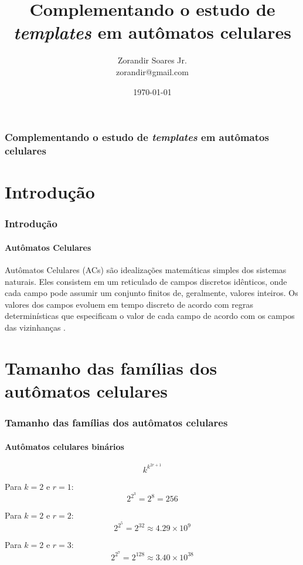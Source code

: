 \documentclass[aspectratio=43]{beamer}
\title{Complementando o estudo de \textit{templates} em autômatos celulares}
\author{Zorandir Soares Jr.\\
zorandir@gmail.com
}
\institute{Universidade Presbiteriana Mackenzie\\
Programa de Pós-Graduação em Engenharia Elétrica\\ \\
}
\date{\today}
\begin{document}
\begin{frame}
	\frametitle{Complementando o estudo de \textit{templates} em autômatos celulares}
    \titlepage
\end{frame}
 
 \section{Introdução}
 \begin{frame}
     \frametitle{Introdução}
     \framesubtitle{Autômatos Celulares}

     Autômatos Celulares (ACs) são idealizações matemáticas simples dos sistemas naturais. Eles consistem em um reticulado de campos discretos idênticos, onde cada campo pode assumir um conjunto finitos de, geralmente, valores inteiros. Os valores dos campos evoluem em tempo discreto de acordo com regras determinísticas que especificam o valor de cada campo de acordo com os campos das vizinhanças \cite{wolfram1994cellular}.
 \end{frame}

\section{Tamanho das famílias dos autômatos celulares}
\begin{frame}
\frametitle{Tamanho das famílias dos autômatos celulares}
\framesubtitle{Autômatos celulares binários}

 \begin{equation}
k^{k^{2r+1}}
\label{eq:tamFamilia}
\end{equation}

Para $k=2$ e $r=1$:
\begin{equation}
2^{2^{3}} = 2^{8} = 256
\end{equation}

Para $k=2$ e $r=2$:
\begin{equation}
2^{2^{5}} = 2^{32} \approx 4.29\times 10^9
\end{equation}

Para $k=2$ e $r=3$:
\begin{equation}
2^{2^{7}} = 2^{128} \approx 3.40\times 10^{38}
\end{equation}

\end{frame}
\end{document}
